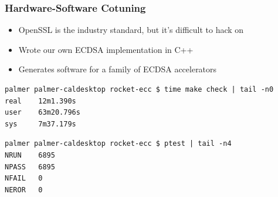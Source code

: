 \documentclass{beamer}
\begin{document}
\begin{frame}[fragile]
  \frametitle{Hardware-Software Cotuning}

  \begin{itemize}
  \item OpenSSL is the industry standard, but it's difficult to hack on
  \item Wrote our own ECDSA implementation in C++
  \item Generates software for a family of ECDSA accelerators
  \end{itemize}

\begin{center}
\begin{minipage}{0.65\linewidth}
\tiny
\begin{verbatim}
palmer palmer-caldesktop rocket-ecc $ time make check | tail -n0
real    12m1.390s
user    63m20.796s
sys     7m37.179s
\end{verbatim}
\begin{verbatim}
palmer palmer-caldesktop rocket-ecc $ ptest | tail -n4
NRUN    6895
NPASS   6895
NFAIL   0
NEROR   0
\end{verbatim}
\end{minipage}
\end{center}

\end{frame}
\end{document}
